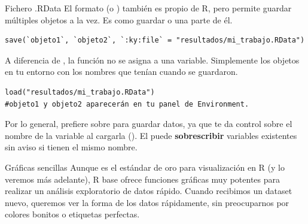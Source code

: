 \documentclass[8pt]{beamer}
\begin{document}
\begin{frame}[fragile]{Fichero .RData}
El formato  (o ) también es propio de R, pero permite guardar múltiples objetos a la vez. Es como guardar  o una parte de él.

\begin{lstlisting}[style=RScript]
save(`objeto1`, `objeto2`, `:ky:file` = "resultados/mi_trabajo.RData")
\end{lstlisting}


A diferencia de , la función  no se asigna a una variable. Simplemente  los objetos en tu entorno con los nombres que tenían cuando se guardaron.

\begin{lstlisting}[style=RScript]
load("resultados/mi_trabajo.RData")
#objeto1 y objeto2 aparecerán en tu panel de Environment.	
\end{lstlisting}
\end{frame}




\begin{frame}[fragile]
	Por lo general, prefiere  sobre  para guardar datos, ya que te da control sobre el nombre de la variable al cargarla (). El  puede \textbf{sobrescribir} variables existentes sin aviso si tienen el mismo nombre.
\end{frame}





\begin{frame}[fragile]{Gr\'aficas sencillas}
	Aunque  es el estándar de oro para visualización en R (y lo veremos más adelante), R base ofrece funciones gráficas muy potentes para realizar un análisis exploratorio de datos rápido. Cuando recibimos un dataset nuevo, queremos ver la forma de los datos rápidamente, sin preocuparnos por colores bonitos o etiquetas perfectas.
\end{frame}
\end{document}
